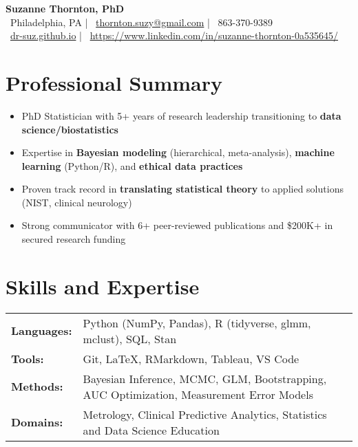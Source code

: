 \documentclass[10pt]{article}
\begin{document}
\begin{center}
    {\Huge\bfseries Suzanne Thornton, PhD} \\[5pt]
    {\large\color{secondary}
    \faMapMarker\ Philadelphia, PA \hspace{0.5em} | \hspace{0.5em}
    \faEnvelope\ \href{mailto:thornton.suzy@gmail.com}{thornton.suzy@gmail.com} \hspace{0.5em} | \hspace{0.5em}
    \faPhone\ 863-370-9389 \\[5pt]
    \faGithub\ \href{https://dr-suz.github.io}{dr-suz.github.io} \hspace{0.5em} | \hspace{0.5em}
    \faLinkedin\ \href{https://www.linkedin.com/in/suzanne-thornton-0a535645/}{https://www.linkedin.com/in/suzanne-thornton-0a535645/} 
    }
\end{center}

\section*{Professional Summary} %
\begin{itemize}[leftmargin=*,nosep]
    \item PhD Statistician with 5+ years of research leadership transitioning to \textbf{data science/biostatistics}
    \item Expertise in \textbf{Bayesian modeling} (hierarchical, meta-analysis), \textbf{machine learning} (Python/R), and \textbf{ethical data practices}
    \item Proven track record in \textbf{translating statistical theory} to applied solutions (NIST, clinical neurology)
    \item Strong communicator with 6+ peer-reviewed publications and \$200K+ in secured research funding
\end{itemize}

\section*{Skills and Expertise}
\begin{tabular}{@{}ll@{}}
    \textbf{Languages:} & Python (NumPy, Pandas), R (tidyverse, glmm, mclust), SQL, Stan \\
    \textbf{Tools:} & Git, LaTeX, RMarkdown, Tableau, VS Code \\
    \textbf{Methods:} & Bayesian Inference, MCMC, GLM, Bootstrapping, AUC Optimization, Measurement Error Models \\
    \textbf{Domains:} & Metrology, Clinical Predictive Analytics, Statistics and Data Science Education  
\end{tabular}
\end{document}
